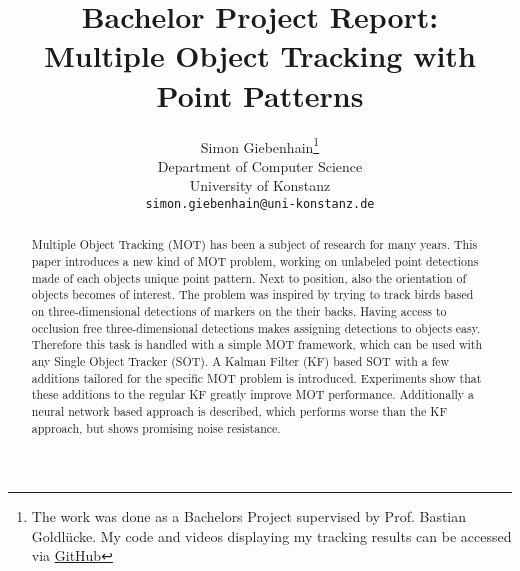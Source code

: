 \documentclass{article}
\title{Bachelor Project Report: \\ Multiple Object Tracking with Point Patterns}
\author{
  Simon Giebenhain\thanks{The work was done as a Bachelors Project supervised by Prof. Bastian Goldlücke. My code and videos displaying my tracking results can be accessed via \href{https://github.com/SimonGiebenhain/tracking}{GitHub}} \\
  Department of Computer Science\\
  University of Konstanz\\
  \texttt{simon.giebenhain@uni-konstanz.de} \\
}
\begin{document}
\maketitle

\begin{abstract}
Multiple Object Tracking (MOT) has been a subject of research for many years. This paper introduces a new kind of MOT problem, working on unlabeled point detections made of each objects unique point pattern. Next to position, also the orientation of objects becomes of interest. The problem was inspired by trying to track birds based on three-dimensional detections of markers on the their backs. Having access to occlusion free three-dimensional detections makes assigning detections to objects easy. Therefore this task is handled with a simple MOT framework, which can be used with any Single Object Tracker (SOT). A Kalman Filter (KF) based SOT with a few additions tailored for the specific MOT problem is introduced. Experiments show that these additions to the regular KF greatly improve MOT performance. Additionally a neural network based approach is described, which performs worse than the KF approach, but shows promising noise resistance.
\end{abstract}


\end{document}
